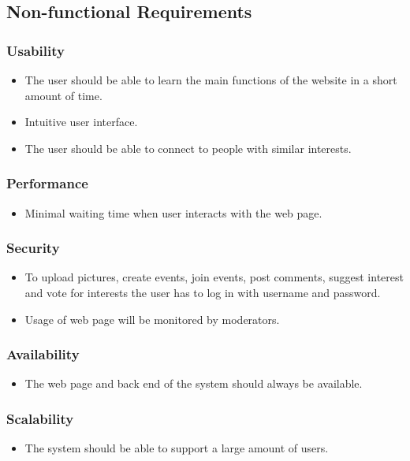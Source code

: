 \subsection{Non-functional Requirements}
\label{subsec:SysReqReqsNonFunc}

\subsubsection{Usability}
\begin{itemize}
    \item The user should be able to learn the main functions of the website in a short amount of time.
    \item Intuitive user interface.
    \item The user should be able to connect to people with similar interests.
\end{itemize}

\subsubsection{Performance}
\begin{itemize}
    \item Minimal waiting time when user interacts with the web page.
\end{itemize}

\subsubsection{Security}
\begin{itemize}
    \item To upload pictures, create events, join events, post comments, suggest interest and vote for interests the user has to log in with username and password.
    \item Usage of web page will be monitored by moderators.
\end{itemize}

\subsubsection{Availability}
\begin{itemize}
    \item The web page and back end of the system should always be available.
\end{itemize}

\subsubsection{Scalability}
\begin{itemize}
    \item The system should be able to support a large amount of users.
\end{itemize}

